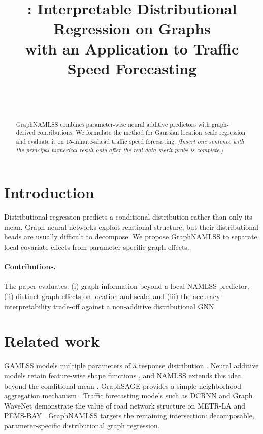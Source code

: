\documentclass[11pt]{article}
\title{\method: Interpretable Distributional Regression on Graphs\\
with an Application to Traffic Speed Forecasting}
\author{%
  \placeholder{Author names}\\
  \small \placeholder{Affiliations}\\
  \small \texttt{\placeholder{corresponding.author@example.org}}
}
\date{}
\newcommand{\method}{GraphNAMLSS}
\newcommand{\datasetA}{METR-LA}
\newcommand{\datasetB}{PEMS-BAY}
\newcommand{\placeholder}[1]{\textcolor{placeholdergray}{\textit{[#1]}}}
\begin{document}
\maketitle

\begin{abstract}
\method{} combines parameter-wise neural additive predictors with graph-derived
contributions. We formulate the method for Gaussian location--scale regression
and evaluate it on 15-minute-ahead traffic speed forecasting.
\placeholder{Insert one sentence with the principal numerical result only after
the real-data merit probe is complete.}
\end{abstract}

\section{Introduction}
\label{sec:introduction}

Distributional regression predicts a conditional distribution rather than only
its mean. Graph neural networks exploit relational structure, but their
distributional heads are usually difficult to decompose. We propose \method{} to
separate local covariate effects from parameter-specific graph effects.

\paragraph{Contributions.}
The paper evaluates: (i) graph information beyond a local NAMLSS predictor,
(ii) distinct graph effects on location and scale, and (iii) the accuracy--
interpretability trade-off against a non-additive distributional GNN.

\section{Related work}
\label{sec:related}

GAMLSS models multiple parameters of a response distribution
\citep{rigby2005gamlss}. Neural additive models retain feature-wise shape
functions \citep{agarwal2021nam}, and NAMLSS extends this idea beyond the
conditional mean \citep{thielmann2023namlss}. GraphSAGE provides a simple
neighborhood aggregation mechanism \citep{hamilton2017graphsage}. Traffic
forecasting models such as DCRNN and Graph WaveNet demonstrate the value of road
network structure on \datasetA{} and \datasetB{}
\citep{li2018dcrnn,wu2019graphwavenet}. \method{} targets the remaining
intersection: decomposable, parameter-specific distributional graph regression.
\end{document}
